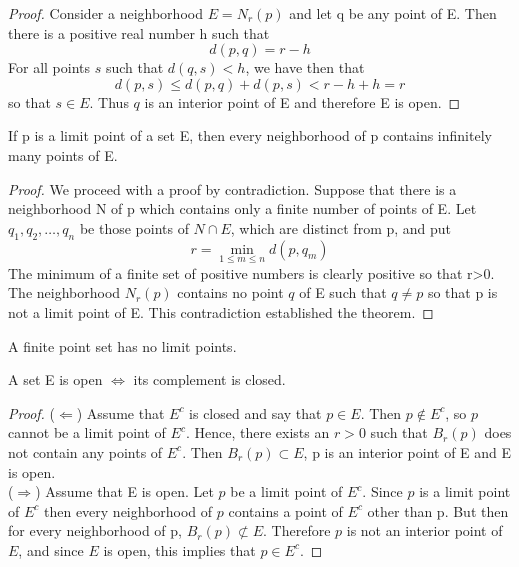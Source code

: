 \documentclass{tufte-book}
\theoremstyle{definition}
\numberwithin{section}{chapter}
\begin{document}
\begin{proof}
Consider a neighborhood $E = N_r (p) $ and let q be any point of E.  Then there is a positive real number h such that 
\[d(p,q) = r-h\]
For all points $s$ such that $d(q,s)<h$, we have then that
\[d(p,s) \leq d(p,q) + d(p,s) < r-h+h = r\]
so that $s\in E$.  Thus $q$ is an interior point of E and therefore E is open. 
\end{proof}

 If p is a limit point of a set E, then every neighborhood of p contains infinitely many points of E.

\begin{proof}
We proceed with a proof by contradiction.  Suppose that there is a neighborhood N of p which contains only a finite number of points of E.   Let $q_1, q_2, \ldots , q_n$ be those points of $N \cap E$, which are distinct from p, and put
\[r = \min_{1\leq m \leq n} d(p,q_m)\]
The minimum of a finite set of positive numbers is clearly positive so that r>0.\\ 

The neighborhood $N_{r}(p)$ contains no point $q$ of E such that $q \neq p$ so that p is not a limit point of E.  This contradiction established the theorem.
\end{proof}

 A finite point set has no limit points.

 A set E is open $\iff$ its complement is closed.

\begin{proof}
($\Leftarrow$)  Assume that $E^c$ is closed and say that $p \in E$.  Then $p \notin E^c$, so $p$ cannot be a limit point of $E^c$.  Hence, there exists an $r>0$ such that $B_r (p)$ does not contain any points of $E^c$.  Then $B_r (p) \subset E$, p is an interior point of E and E is open.\\
($\Rightarrow$)  Assume that E is open.  Let $p$ be a limit point of $E^c$.  Since $p$ is a limit point of  $E^c$ then every neighborhood of $p$ contains a point of  $E^c$ other than p.   But then for every neighborhood of p, $B_r (p) \not \subset E$.  Therefore $p$ is not an interior point of $E$, and since $E$ is open, this implies that $p \in E^c$.
\end{proof}

\end{document}
